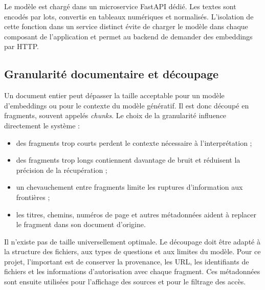 Le modèle est chargé dans un microservice FastAPI dédié. Les textes sont encodés par lots, convertis en tableaux numériques et normalisés. L'isolation de cette fonction dans un service distinct évite de charger le modèle dans chaque composant de l'application et permet au backend de demander des embeddings par HTTP.

\subsection{Granularité documentaire et découpage}

Un document entier peut dépasser la taille acceptable pour un modèle d'embeddings ou pour le contexte du modèle génératif. Il est donc découpé en fragments, souvent appelés \textit{chunks}. Le choix de la granularité influence directement le système :

\begin{itemize}
    \item des fragments trop courts perdent le contexte nécessaire à l'interprétation ;
    \item des fragments trop longs contiennent davantage de bruit et réduisent la précision de la récupération ;
    \item un chevauchement entre fragments limite les ruptures d'information aux frontières ;
    \item les titres, chemins, numéros de page et autres métadonnées aident à replacer le fragment dans son document d'origine.
\end{itemize}

Il n'existe pas de taille universellement optimale. Le découpage doit être adapté à la structure des fichiers, aux types de questions et aux limites du modèle. Pour ce projet, l'important est de conserver la provenance, les URL, les identifiants de fichiers et les informations d'autorisation avec chaque fragment. Ces métadonnées sont ensuite utilisées pour l'affichage des sources et pour le filtrage des accès.
